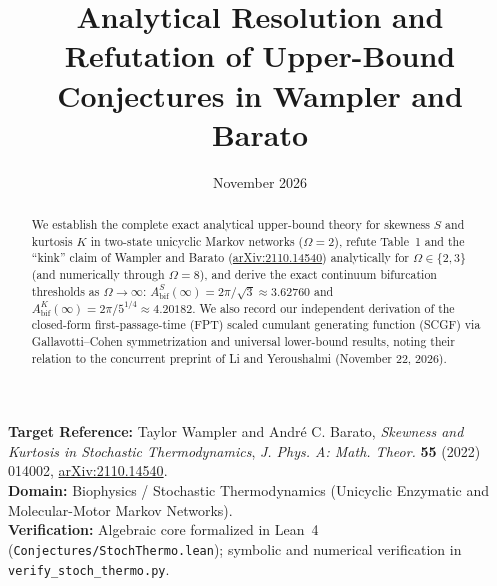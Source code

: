 \documentclass[11pt]{article}
\title{Analytical Resolution and Refutation of Upper-Bound Conjectures in Wampler and Barato}
\author{}
\date{November 2026}
\theoremstyle{definition}
\theoremstyle{remark}
\begin{document}
\maketitle

\begin{center}
\small
\textbf{Target Reference:} Taylor Wampler and Andr\'e C. Barato, \emph{Skewness and Kurtosis in Stochastic Thermodynamics},
\emph{J. Phys. A: Math. Theor.} \textbf{55} (2022) 014002,
\href{https://arxiv.org/abs/2110.14540}{arXiv:2110.14540}.\\[3pt]
\textbf{Domain:} Biophysics / Stochastic Thermodynamics (Unicyclic Enzymatic and Molecular-Motor Markov Networks).\\[3pt]
\textbf{Verification:} Algebraic core formalized in Lean~4 (\texttt{Conjectures/StochThermo.lean}); symbolic and numerical verification in \texttt{verify\_stoch\_thermo.py}.
\end{center}

\medskip

\begin{abstract}
We establish the complete exact analytical upper-bound theory for skewness $S$ and kurtosis $K$ in two-state unicyclic Markov networks ($\Omega = 2$), refute Table~1 and the ``kink'' claim of Wampler and Barato (\href{https://arxiv.org/abs/2110.14540}{arXiv:2110.14540}) analytically for $\Omega \in \{2, 3\}$ (and numerically through $\Omega = 8$), and derive the exact continuum bifurcation thresholds as $\Omega \to \infty$: $A_{\mathrm{bif}}^S(\infty) = 2\pi/\sqrt{3} \approx 3.62760$ and $A_{\mathrm{bif}}^K(\infty) = 2\pi/5^{1/4} \approx 4.20182$. We also record our independent derivation of the closed-form first-passage-time (FPT) scaled cumulant generating function (SCGF) via Gallavotti--Cohen symmetrization and universal lower-bound results, noting their relation to the concurrent preprint of Li and Yeroushalmi (November 22, 2026).
\end{abstract}
\end{document}
